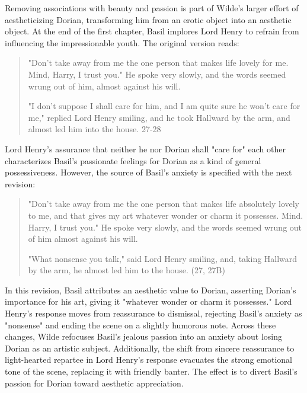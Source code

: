 \documentclass[11pt]{article}
\begin{document}
Removing associations with beauty and passion is part of Wilde's
larger effort of aestheticizing Dorian, transforming him from an
erotic object into an aesthetic object. At the end of the first
chapter, Basil implores Lord Henry to refrain from influencing the
impressionable youth. The original version reads:
\begin{quote}
"Don't take away from me the one person that makes life lovely for me.
Mind, Harry, I trust you." He spoke very slowly, and the words seemed
wrung out of him, almost against his will.

"I don't suppose I shall care for him, and I am quite sure he won't
care for me," replied Lord Henry smiling, and he took Hallward by the
arm, and almost led him into the house. 27-28
\end{quote}
Lord Henry's assurance that neither he nor Dorian shall "care for"
each other characterizes Basil's passionate feelings for Dorian as a
kind of general possessiveness. However, the source of Basil's anxiety
is specified with the next revision:
\begin{quote}
"Don't take away from me the one person that makes life absolutely
lovely to me, and that gives my art whatever wonder or charm it
possesses. Mind. Harry, I trust you." He spoke very slowly, and the
words seemed wrung out of him almost against his will.

"What nonsense you talk," said Lord Henry smiling, and, taking
Hallward by the arm, he almost led him to the house. (27, 27B)
\end{quote}
In this revision, Basil attributes an aesthetic value to Dorian,
asserting Dorian's importance for his art, giving it "whatever wonder
or charm it possesses." Lord Henry's response moves from reassurance
to dismissal, rejecting Basil's anxiety as "nonsense" and ending the
scene on a slightly humorous note. Across these changes, Wilde
refocuses Basil's jealous passion into an anxiety about losing Dorian
as an artistic subject. Additionally, the shift from sincere
reassurance to light-hearted repartee in Lord Henry's response
evacuates the strong emotional tone of the scene, replacing it with
friendly banter. The effect is to divert Basil's passion for Dorian
toward aesthetic appreciation.
\end{document}
